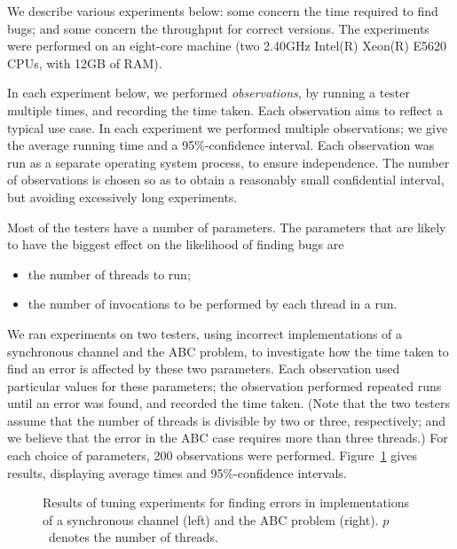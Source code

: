 We describe various experiments below: some concern the time required to find
bugs; and some concern the throughput for correct versions.
%
The experiments were performed on an eight-core machine (two 2.40GHz Intel(R)
Xeon(R) E5620 CPUs, with 12GB of RAM).

In each experiment below, we performed \emph{observations}, by running a
tester multiple times, and recording the time taken.  Each observation aims to
reflect a typical use case.  In each experiment we performed multiple
observations; we give the average running time and a 95\%-confidence interval.
Each observation was run as a separate operating system process, to ensure
independence.  The number of observations is chosen so as to obtain a
reasonably small confidential interval, but avoiding excessively long
experiments.



Most of the testers have a number of parameters.  The parameters that are
likely to have the biggest effect on the likelihood of finding bugs are
%
\begin{itemize}
\item the number of threads to run;
\item the number of invocations to be performed by each thread in a run.
\end{itemize}
%
We ran experiments on two testers, using incorrect implementations of a
synchronous channel and the ABC problem, to investigate how the time taken to
find an error is affected by these two parameters.  Each observation used
particular values for these parameters; the observation performed repeated
runs until an error was found, and recorded the time taken.  (Note that the
two testers assume that the number of threads is divisible by two or three,
respectively; and we believe that the error in the ABC case requires more than
three threads.)  For each choice of parameters, 200 observations were
performed.  Figure~\ref{fig:tuning} gives results, displaying average times
and 95\%-confidence intervals.


\begin{figure}
\begin{minipage}{0.5\textwidth}

\end{minipage}
%
\begin{minipage}{0.5\textwidth}

\end{minipage}%
\caption{Results of tuning experiments for finding errors in implementations
  of a synchronous channel (left) and the ABC problem (right).  $p$~denotes
  the number of threads.  \label{fig:tuning}}
\end{figure}

